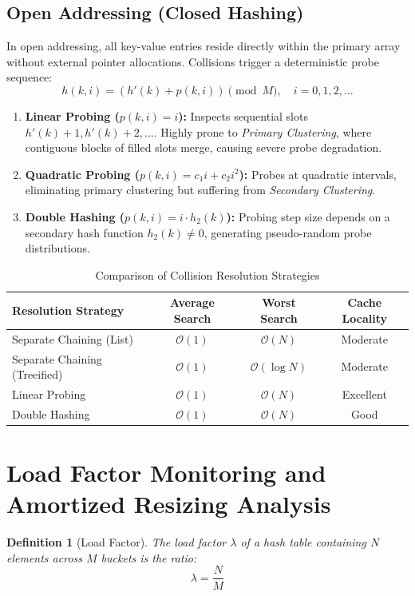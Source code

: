 \documentclass[10pt,twocolumn,letterpaper]{article}
\newtheorem{definition}[theorem]{Definition}
\begin{document}
\subsection{Open Addressing (Closed Hashing)}
In open addressing, all key-value entries reside directly within the primary array without external pointer allocations. Collisions trigger a deterministic probe sequence:
\[
h(k, i) = (h'(k) + p(k, i)) \pmod M, \quad i = 0, 1, 2, \dots
\]
\begin{enumerate}
    \item \textbf{Linear Probing ($p(k, i) = i$):} Inspects sequential slots $h'(k)+1, h'(k)+2, \dots$. Highly prone to \emph{Primary Clustering}, where contiguous blocks of filled slots merge, causing severe probe degradation.
    \item \textbf{Quadratic Probing ($p(k, i) = c_1 i + c_2 i^2$):} Probes at quadratic intervals, eliminating primary clustering but suffering from \emph{Secondary Clustering}.
    \item \textbf{Double Hashing ($p(k, i) = i \cdot h_2(k)$):} Probing step size depends on a secondary hash function $h_2(k) \neq 0$, generating pseudo-random probe distributions.
\end{enumerate}

\begin{table}[h]
\centering
\caption{Comparison of Collision Resolution Strategies}
\label{tab:collision-comparison}
\begin{tabular}{lccc}
\toprule
\textbf{Resolution Strategy} & \textbf{Average Search} & \textbf{Worst Search} & \textbf{Cache Locality} \\
\midrule
Separate Chaining (List) & $\mathcal{O}(1)$ & $\mathcal{O}(N)$ & Moderate \\
Separate Chaining (Treeified) & $\mathcal{O}(1)$ & $\mathcal{O}(\log N)$ & Moderate \\
Linear Probing & $\mathcal{O}(1)$ & $\mathcal{O}(N)$ & Excellent \\
Double Hashing & $\mathcal{O}(1)$ & $\mathcal{O}(N)$ & Good \\
\bottomrule
\end{tabular}
\end{table}

\section{Load Factor Monitoring and Amortized Resizing Analysis}
\label{sec:load-factor}

\begin{definition}[Load Factor]
The load factor $\lambda$ of a hash table containing $N$ elements across $M$ buckets is the ratio:
\[
\lambda = \frac{N}{M}
\]
\end{definition}
\end{document}
